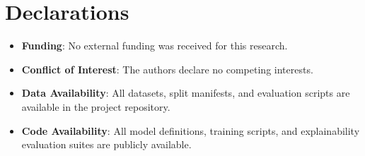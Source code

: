 \documentclass[default,iicol]{sn-jnl}
\begin{document}
\section*{Declarations}
\begin{itemize}
    \item \textbf{Funding}: No external funding was received for this research.
    \item \textbf{Conflict of Interest}: The authors declare no competing interests.
    \item \textbf{Data Availability}: All datasets, split manifests, and evaluation scripts are available in the project repository.
    \item \textbf{Code Availability}: All model definitions, training scripts, and explainability evaluation suites are publicly available.
\end{itemize}


\end{document}
